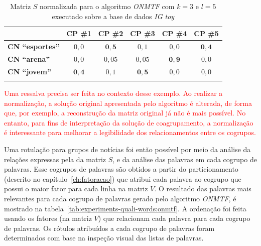 \documentclass[
    12pt,                %
    oneside,            %
    a4paper,            %
    english,            %
    brazil                %
    ]{abntex2ppgsi}
\begin{document}
\begin{table}[H]
    \centering
    \caption{Matriz $S$ normalizada para o algoritmo \textit{ONMTF} com $k = 3$ e $l = 5$ executado sobre a base de dados \textit{IG toy}}
    \begin{tabular}{lccccc}
        \hline
         & \textbf{CP \#1} & \textbf{CP \#2} & \textbf{CP \#3} & \textbf{CP \#4} & \textbf{CP \#5} \\
        \hline
        \textbf{CN ``esportes''} & $0,0$ & $\mathbf{0,5}$  & $0,1$  & $0,0$ & $\mathbf{0,4}$ \\
        \textbf{CN ``arena''}    & $0,0$ & $0,05$ & $0,05$ & $\mathbf{0,9}$ & $0,0$ \\
        \textbf{CN ``jovem''}    & $\mathbf{0,4}$ & $0,1$  & $\mathbf{0,5}$  & $0,0$ & $0,0$ \\
        \hline \\
    \end{tabular}
    \label{tab:onmtf:matrizS}
\end{table}

\textcolor{red}{Uma ressalva precisa ser feita no contexto desse exemplo. Ao realizar a normalização, a solução original apresentada pelo algoritmo é alterada, de forma que, por exemplo, a reconstrução da matriz original já não é mais possível. No entanto, para fins de interpretação da solução de coagrupamento, a normalização é interessante para melhorar a legibilidade dos relacionamentos entre os cogrupos.}

Uma rotulação para grupos de notícias foi então possível por meio da análise da relações expressas pela da matriz $S$, e da análise das palavras em cada cogrupo de palavras. Esse cogrupos de palavras são obtidos a partir do particionamento (descrito no capítulo~\ref{ch:fatoracao}) que atribui cada palavra ao cogrupo que possui o maior fator para cada linha na matriz $V$. O resultado das palavras mais relevantes para cada cogrupo de palavras gerado pelo algoritmo \textit{ONMTF}, é mostrado na tabela~\ref{tab:experiments-quali-words:onmtf}. A ordenação foi feita usando os fatores (na matriz $V$) que relacionam cada palavra para cada cogrupo de palavras. Os rótulos atribuídos a cada cogrupo de palavras foram determinados com base na inspeção visual das listas de palavras.
\end{document}
